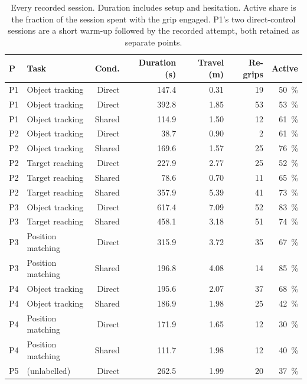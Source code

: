 \begin{table}[htbp]
  \centering
  \scriptsize
  \caption[Every pilot session]{Every recorded session. Duration includes
  setup and hesitation. Active share is the fraction of the session spent
  with the grip engaged. P1's two direct-control sessions are a short
  warm-up followed by the recorded attempt, both retained as separate
  points.}
  \label{tab:pilot-sessions}
  \begin{tabular}{@{}llrrrrr@{}}
    \toprule
    P & Task & Cond. & Duration (s) & Travel (m) & Re-grips & Active \\
    \midrule
    P1 & Object tracking  & Direct & 147.4 & 0.31 & 19 & \SI{50}{\percent} \\
    P1 & Object tracking  & Direct & 392.8 & 1.85 & 53 & \SI{53}{\percent} \\
    P1 & Object tracking  & Shared & 114.9 & 1.50 & 12 & \SI{61}{\percent} \\
    P2 & Object tracking  & Direct & 38.7  & 0.90 & 2  & \SI{61}{\percent} \\
    P2 & Object tracking  & Shared & 169.6 & 1.57 & 25 & \SI{76}{\percent} \\
    P2 & Target reaching  & Direct & 227.9 & 2.77 & 25 & \SI{52}{\percent} \\
    P2 & Target reaching  & Shared & 78.6  & 0.70 & 11 & \SI{65}{\percent} \\
    P2 & Target reaching  & Shared & 357.9 & 5.39 & 41 & \SI{73}{\percent} \\
    P3 & Object tracking  & Direct & 617.4 & 7.09 & 52 & \SI{83}{\percent} \\
    P3 & Target reaching  & Shared & 458.1 & 3.18 & 51 & \SI{74}{\percent} \\
    P3 & Position matching & Direct & 315.9 & 3.72 & 35 & \SI{67}{\percent} \\
    P3 & Position matching & Shared & 196.8 & 4.08 & 14 & \SI{85}{\percent} \\
    P4 & Object tracking  & Direct & 195.6 & 2.07 & 37 & \SI{68}{\percent} \\
    P4 & Object tracking  & Shared & 186.9 & 1.98 & 25 & \SI{42}{\percent} \\
    P4 & Position matching & Direct & 171.9 & 1.65 & 12 & \SI{30}{\percent} \\
    P4 & Position matching & Shared & 111.7 & 1.98 & 12 & \SI{40}{\percent} \\
    P5 & (unlabelled) & Direct & 262.5 & 1.99 & 20 & \SI{37}{\percent} \\

\end{tabular}
\end{table}
